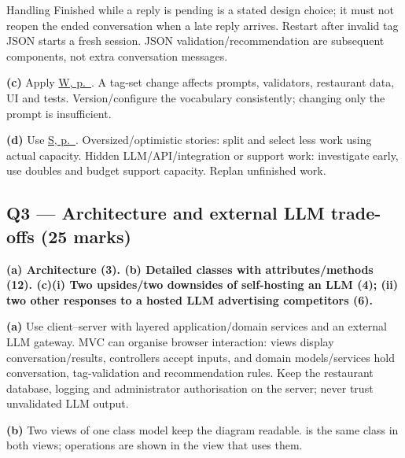 \begin{studycolumns}
\vspace{0pt}



Handling Finished while a reply is pending is a stated design choice; it must not reopen the ended conversation when a late reply arrives. Restart after invalid tag JSON starts a fresh session. JSON validation/\allowbreak{}recommendation are subsequent components, not extra conversation messages.

\textbf{(c)} Apply \hyperref[answer-waterfall]{W, p.\ \pageref{answer-waterfall}}. A tag-set change affects prompts, validators, restaurant data, UI and tests. Version/configure the vocabulary consistently; changing only the prompt is insufficient.

\textbf{(d)} Use \hyperref[answer-scrum]{S, p.\ \pageref{answer-scrum}}. Oversized/optimistic stories: split and select less work using actual capacity. Hidden LLM/API/integration or support work: investigate early, use doubles and budget support capacity. Replan unfinished work.

\end{studycolumns}
\Needspace{85pt}
\subsection*{Q3 --- Architecture and external LLM trade-offs (25 marks)}
\begin{studycolumns}
\textbf{(a) Architecture (3). (b) Detailed classes with attributes/\allowbreak{}methods (12). (c)(i) Two upsides/\allowbreak{}two downsides of self-hosting an LLM (4); (ii) two other responses to a hosted LLM advertising competitors (6).}


\textbf{(a)} Use client--server with layered application/\allowbreak{}domain services and an external LLM gateway. MVC can organise browser interaction: views display conversation/\allowbreak{}results, controllers accept inputs, and domain models/\allowbreak{}services hold conversation, tag-validation and recommendation rules. Keep the restaurant database, logging and administrator authorisation on the server; never trust unvalidated LLM output.

\textbf{(b)} Two views of one class model keep the diagram readable.  is the same class in both views; operations are shown in the view that uses them.
\end{studycolumns}


